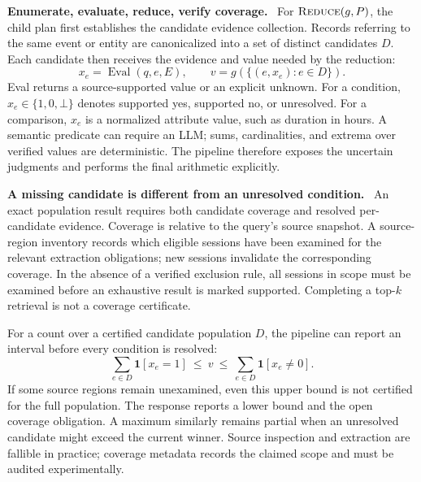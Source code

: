 \documentclass[10pt,twocolumn]{article}
\newcommand{\red}{\textsc{Reduce}}
\newcommand{\runin}[1]{\smallskip\noindent\textbf{#1.}\ }
\begin{document}
\runin{Enumerate, evaluate, reduce, verify coverage}
For $\red(g,P)$, the child plan first establishes the candidate evidence
collection. Records referring to the same event or entity are
canonicalized into a set of distinct candidates $D$. Each candidate
then receives the evidence and value needed by the reduction:
\begin{equation}
\label{eq:new-reduce}
x_e=\operatorname{Eval}(q,e,E),\qquad
v=g(\{(e,x_e):e\in D\}).
\end{equation}
Eval returns a source-supported value or an explicit unknown. For a
condition, $x_e\in\{1,0,\bot\}$ denotes supported yes, supported no, or
unresolved. For a comparison, $x_e$ is a normalized attribute value,
such as duration in hours. A semantic predicate can require an LLM;
sums, cardinalities, and extrema over verified values are deterministic.
The pipeline therefore exposes the uncertain judgments and performs
the final arithmetic explicitly.

\runin{A missing candidate is different from an unresolved condition}
An exact population result requires both candidate coverage and resolved
per-candidate evidence. Coverage is relative to the query's source
snapshot. A source-region inventory records which eligible sessions
have been examined for the relevant extraction obligations; new
sessions invalidate the corresponding coverage. In the absence of a
verified exclusion rule, all sessions in scope must be examined before
an exhaustive result is marked supported. Completing a top-$k$
retrieval is not a coverage certificate.

For a count over a certified candidate population $D$, the pipeline
can report an interval before every condition is resolved:
\begin{equation}
\label{eq:new-count-bounds}
\sum_{e\in D}\mathbf{1}[x_e=1]
\ \leq\ v\ \leq\
\sum_{e\in D}\mathbf{1}[x_e\neq0].
\end{equation}
If some source regions remain unexamined, even this upper bound is
not certified for the full population. The response reports a lower
bound and the open coverage obligation. A maximum similarly remains
partial when an unresolved candidate might exceed the current winner.
Source inspection and extraction are fallible in practice; coverage
metadata records the claimed scope and must be audited experimentally.
\end{document}
